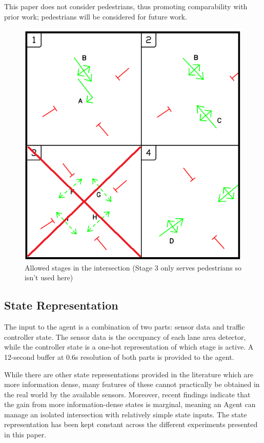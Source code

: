 \documentclass[conference]{IEEEtran}
\begin{document}
This paper does not consider pedestrians, thus promoting comparability with prior work; pedestrians will be considered for future work. 
\begin{figure}[thpb]
    \centering
    \includegraphics[width=\linewidth]{figures/phases_noped.png}
    \caption{Allowed stages in the intersection (Stage 3 only serves pedestrians so isn't used here)}
    \label{fig:phases}
\end{figure}

\subsection{State Representation}
The input to the agent is a combination of two parts: sensor data and traffic controller state. 
The sensor data is the occupancy of each lane area detector, while the controller state is a one-hot representation of which stage is active.
A 12-second buffer at 0.6s resolution of both parts is provided to the agent.

While there are other state representations provided in the literature which are more information dense, many features of these cannot practically be obtained in the real world by the available sensors.
Moreover, recent findings \cite{genders2018} indicate that the gain from more information-dense states is marginal, meaning an Agent can manage an isolated intersection with relatively simple state inputs.
The state representation has been kept constant across the different experiments presented in this paper.
\end{document}
